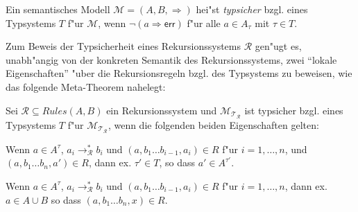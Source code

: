 \documentclass[12pt,a4paper,final]{article}
\begin{document}
\begin{definition}[Typsicherheit]
  Ein semantisches Modell \mbox{$\mathcal{M} = (A,B,\Rightarrow)$} hei"st \emph{typsicher} bzgl.\xspace
  eines Typsystems $T$ f"ur $\mathcal{M}$, wenn \mbox{$\neg(a \Rightarrow \mathsf{err})$} f"ur
  alle \mbox{$a \in A_\tau$} mit \mbox{$\tau \in T$}.
\end{definition}

Zum Beweis der Typsicherheit eines Rekursionssystems $\mathcal{R}$ gen"ugt es, unabh"angig von
der konkreten Semantik des Rekursionssystems, zwei ``lokale Eigenschaften'' "uber die Rekursionsregeln
bzgl.\xspace des Typsystems zu beweisen, wie das folgende Meta-Theorem nahelegt:

\begin{theorem}[Typsicherheit]
  Sei \mbox{$\mathcal{R} \subseteq \mathit{Rules}(A,B)$} ein Rekursionssystem und
  \mbox{$\mathcal{M}_{\mathcal{T}_{\mathcal{R}}}$} ist typsicher bzgl.\xspace
  eines Typsystems $T$ f"ur \mbox{$\mathcal{M}_{\mathcal{T}_{\mathcal{R}}}$}, wenn
  die folgenden beiden Eigenschaften gelten:
  \begin{description}[labelindent=\parindent,style=nextline]
  \item[Local Preservation] 
    Wenn \mbox{$a \in A^\tau$},
    \mbox{$a_i \rightarrow_{\mathcal{R}}^* b_i$} und \mbox{$(a,b_1 \ldots b_{i-1},a_i) \in R$} f"ur
    \mbox{$i=1,\ldots,n$}, und \mbox{$(a,b_1 \ldots b_n,a') \in R$}, dann ex. \mbox{$\tau' \in T$},
    so dass \mbox{$a' \in A^{\tau'}$}.
    
  \item[Local Progress]
    Wenn \mbox{$a \in A^\tau$},
    \mbox{$a_i \rightarrow_{\mathcal{R}}^* b_i$} und \mbox{$(a,b_1 \ldots b_{i-1},a_i) \in R$} f"ur
    \mbox{$i=1,\ldots,n$}, dann ex. \mbox{$a \in A \cup B$} so dass \mbox{$(a,b_1 \ldots b_n,x) \in R$}.
  \end{description}
\end{theorem}





\end{document}
